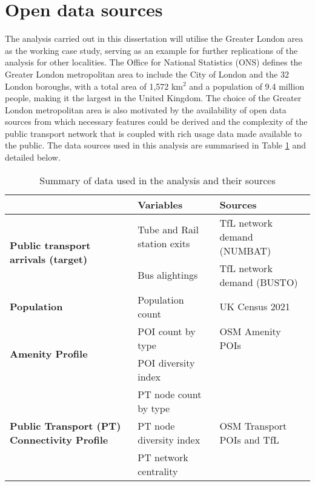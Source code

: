 \section{Open data sources}

The analysis carried out in this dissertation will utilise the Greater London area as the working case study, serving as an example for further replications of the analysis for other localities. The Office for National Statistics (ONS) defines the Greater London metropolitan area to include the City of London and the 32 London boroughs, with a total area of 1,572 km$^2$ and a population of 9.4 million people, making it the largest in the United Kingdom. The choice of the Greater London metropolitan area is also motivated by the availability of open data sources from which necessary features could be derived and the complexity of the public transport network that is coupled with rich usage data made available to the public. The data sources used in this analysis are summarised in Table \ref{tab:datasources} and detailed below.


\begin{table}[ht]
    \centering
    \renewcommand{\arraystretch}{1.5}
    \begin{tabular}{|l|l|l|}
        \hline 
        \rowcolor{lightgray}
        \textbf{} & \textbf{Variables} & \textbf{Sources} \\
        \hline

        \multirow{2}{12em}{\textbf{Public transport arrivals (target)}} 
        & Tube and Rail station exits & TfL network demand (NUMBAT) \\ 
        & Bus alightings & TfL network demand (BUSTO) \\
        \hline

        \textbf{Population} & Population count & UK Census 2021 \\
        \hline

        \multirow{2}{12em}{\textbf{Amenity Profile}} 
        & POI count by type & OSM Amenity POIs \\ 
        & POI diversity index & \\ 
        \hline 

        \multirow{3}{12em}{\textbf{Public Transport (PT) Connectivity Profile}} 
        & PT node count by type &  \\
        & PT node diversity index & OSM Transport POIs and TfL \\
        & PT network centrality &  \\
        \hline

            \end{tabular}
    \caption{Summary of data used in the analysis and their sources}
    \label{tab:datasources}
\end{table}

